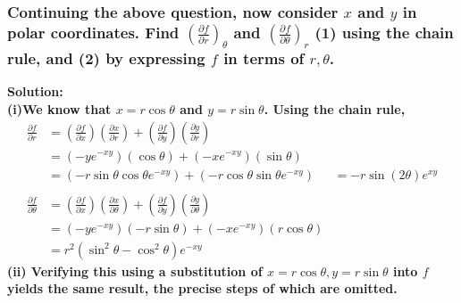 \documentclass{article}
\begin{document}
\subsubsection*{Continuing the above question, now consider $x$ and $y$ in polar coordinates. Find $(\frac{\partial f}{\partial r})_{\theta}$ and $(\frac{\partial f}{\partial \theta})_r$ (1) using the chain rule, and (2) by expressing $f$ in terms of $r, \theta$.}
\bf Solution: \\
(i)\normalfont  We know that $x = r \cos \theta$ and $y = r \sin \theta$. Using the chain rule, 
\begin{equation*}
    \begin{aligned}
        \frac{\partial f}{\partial r} &= (\frac{\partial f}{\partial x}) (\frac{\partial x}{\partial r}) + (\frac{\partial f}{\partial y}) (\frac{\partial y}{\partial r}) \\
        &= (-ye^{-xy})(\cos \theta) + (-xe^{-xy})(\sin \theta) \\
        &= (-r \sin \theta \cos \theta e^{-xy}) + (-r \cos \theta \sin \theta e^{-xy})
        &= -r \sin (2\theta) e^{xy} \\ \\
        \frac{\partial f}{\partial \theta} &= (\frac{\partial f}{\partial x})(\frac{\partial x}{\partial \theta}) + (\frac{\partial f}{\partial y})(\frac{\partial y}{\partial \theta}) \\
        &= (-ye^{-xy})(-r\sin \theta) + (-xe^{-xy})(r\cos \theta) \\
        &= r^2(\sin^2\theta - \cos^2\theta)e^{-xy}
    \end{aligned}
\end{equation*}
\bf (ii) \normalfont  Verifying this using a substitution of $x = r\cos \theta, y=r\sin \theta$ into $f$ yields the same result, the precise steps of which are omitted.

\hrulefill
\end{document}
